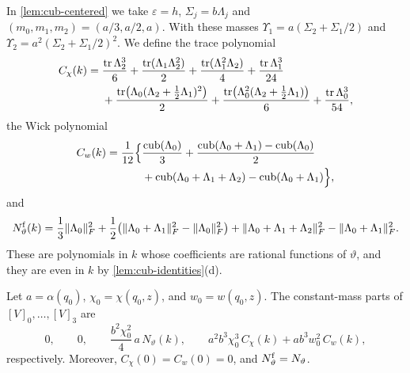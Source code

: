 In \cref{lem:cub-centered} we take $\varepsilon=h$, $\Sigma_j=b\Lambda_j$ and
$(m_0,m_1,m_2)=(a/3,a/2,a)$. With these masses $\Upsilon_1=a(\Sigma_2+\Sigma_1/2)$ and
$\Upsilon_2=a^2(\Sigma_2+\Sigma_1/2)^2$. We define the trace polynomial
\begin{equation}\label{b:eq:os-R}
\begin{aligned}
 C_\chi(k)={}&\frac{\operatorname{tr}\Lambda_2^3}6+\frac{\operatorname{tr}(\Lambda_1\Lambda_2^2)}2
 +\frac{\operatorname{tr}(\Lambda_1^2\Lambda_2)}4+\frac{\operatorname{tr}\Lambda_1^3}{24}\\
 &+\frac{\operatorname{tr}\bigl(\Lambda_0(\Lambda_2+\tfrac12\Lambda_1)^2\bigr)}2
 +\frac{\operatorname{tr}\bigl(\Lambda_0^2(\Lambda_2+\tfrac12\Lambda_1)\bigr)}6
 +\frac{\operatorname{tr}\Lambda_0^3}{54},
\end{aligned}
\end{equation}
the Wick polynomial
\begin{equation}\label{b:eq:os-W}
\begin{aligned}
 C_w(k)=\frac1{12}\Bigl\{&\frac{\operatorname{cub}(\Lambda_0)}3
 +\frac{\operatorname{cub}(\Lambda_0+\Lambda_1)-\operatorname{cub}(\Lambda_0)}2\\
 &+\operatorname{cub}(\Lambda_0+\Lambda_1+\Lambda_2)-\operatorname{cub}(\Lambda_0+\Lambda_1)\Bigr\},
\end{aligned}
\end{equation}
and
\[
 N^{\rm f}_\vartheta(k)=\frac13\lVert \Lambda_0\rVert_F^2
 +\frac12\bigl(\lVert \Lambda_0+\Lambda_1\rVert_F^2-\lVert \Lambda_0\rVert_F^2\bigr)
 +\lVert \Lambda_0+\Lambda_1+\Lambda_2\rVert_F^2-\lVert \Lambda_0+\Lambda_1\rVert_F^2.
\]
These are polynomials in $k$ whose coefficients are rational functions of
$\vartheta$, and they are even in $k$ by \cref{lem:cub-identities}(d).

\begin{proposition}\label{prop:cub-frozen}
Let $a=\alpha(q_0)$, $\chi_0=\chi(q_0,z)$, and $w_0=w(q_0,z)$. The constant-mass
parts of $[V]_0,\dots,[V]_3$ are
\[
 0,\qquad 0,\qquad \frac{b^2\chi_0^2}4\,a\,N_\vartheta(k),\qquad
 a^2b^3\chi_0^3\,C_\chi(k)+ab^3w_0^2\,C_w(k),
\]
respectively. Moreover, $C_\chi(0)=C_w(0)=0$, and
$N^{\rm f}_\vartheta=N_\vartheta$.
\end{proposition}

